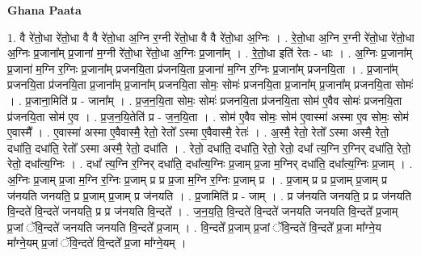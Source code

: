 \documentclass[17pt]{extarticle}
\begin{document}
\textbf{Ghana Paata } \newline

1. वै रे॑तो॒धा रे॑तो॒धा वै वै रे॑तो॒धा अ॒ग्नि र॒ग्नी रे॑तो॒धा वै वै रे॑तो॒धा अ॒ग्निः । . रे॒तो॒धा अ॒ग्नि र॒ग्नी रे॑तो॒धा रे॑तो॒धा अ॒ग्निः प्र॒जाना᳚म् प्र॒जाना॑ म॒ग्नी रे॑तो॒धा रे॑तो॒धा अ॒ग्निः प्र॒जाना᳚म् । . रे॒तो॒धा इति॑ रेतः - धाः । . अ॒ग्निः प्र॒जाना᳚म् प्र॒जाना॑ म॒ग्नि र॒ग्निः प्र॒जाना᳚म् प्रजनयि॒ता प्र॑जनयि॒ता प्र॒जाना॑ म॒ग्नि र॒ग्निः प्र॒जाना᳚म् प्रजनयि॒ता । . प्र॒जाना᳚म् प्रजनयि॒ता प्र॑जनयि॒ता प्र॒जाना᳚म् प्र॒जाना᳚म् प्रजनयि॒ता सोमः॒ सोमः॑ प्रजनयि॒ता प्र॒जाना᳚म् प्र॒जाना᳚म् प्रजनयि॒ता सोमः॑ । . प्र॒जाना॒मिति॑ प्र - जाना᳚म् । . प्र॒ज॒न॒यि॒ता सोमः॒ सोमः॑ प्रजनयि॒ता प्र॑जनयि॒ता सोम॑ ए॒वैव सोमः॑ प्रजनयि॒ता प्र॑जनयि॒ता सोम॑ ए॒व । . प्र॒ज॒न॒यि॒तेति॑ प्र - ज॒न॒यि॒ता । . सोम॑ ए॒वैव सोमः॒ सोम॑ ए॒वास्मा॑ अस्मा ए॒व सोमः॒ सोम॑ ए॒वास्मै᳚ । . ए॒वास्मा॑ अस्मा ए॒वैवास्मै॒ रेतो॒ रेतो᳚ ऽस्मा ए॒वैवास्मै॒ रेतः॑ । . अ॒स्मै॒ रेतो॒ रेतो᳚ ऽस्मा अस्मै॒ रेतो॒ दधा॑ति॒ दधा॑ति॒ रेतो᳚ ऽस्मा अस्मै॒ रेतो॒ दधा॑ति । . रेतो॒ दधा॑ति॒ दधा॑ति॒ रेतो॒ रेतो॒ दधा᳚ त्य॒ग्नि र॒ग्निर् दधा॑ति॒ रेतो॒ रेतो॒ दधा᳚त्य॒ग्निः । . दधा᳚ त्य॒ग्नि र॒ग्निर् दधा॑ति॒ दधा᳚त्य॒ग्निः प्र॒जाम् प्र॒जा म॒ग्निर् दधा॑ति॒ दधा᳚त्य॒ग्निः प्र॒जाम् । . अ॒ग्निः प्र॒जाम् प्र॒जा म॒ग्नि र॒ग्निः प्र॒जाम् प्र प्र प्र॒जा म॒ग्नि र॒ग्निः प्र॒जाम् प्र । . प्र॒जाम् प्र प्र प्र॒जाम् प्र॒जाम् प्र ज॑नयति जनयति॒ प्र प्र॒जाम् प्र॒जाम् प्र ज॑नयति । . प्र॒जामिति॑ प्र - जाम् । . प्र ज॑नयति जनयति॒ प्र प्र ज॑नयति वि॒न्दते॑ वि॒न्दते॑ जनयति॒ प्र प्र ज॑नयति वि॒न्दते᳚ । . ज॒न॒य॒ति॒ वि॒न्दते॑ वि॒न्दते॑ जनयति जनयति वि॒न्दते᳚ प्र॒जाम् प्र॒जां ॅवि॒न्दते॑ जनयति जनयति वि॒न्दते᳚ प्र॒जाम् । . वि॒न्दते᳚ प्र॒जाम् प्र॒जां ॅवि॒न्दते॑ वि॒न्दते᳚ प्र॒जा मा᳚ग्ने॒य मा᳚ग्ने॒यम् प्र॒जां ॅवि॒न्दते॑ वि॒न्दते᳚ प्र॒जा मा᳚ग्ने॒यम् । \newline
\end{document}
